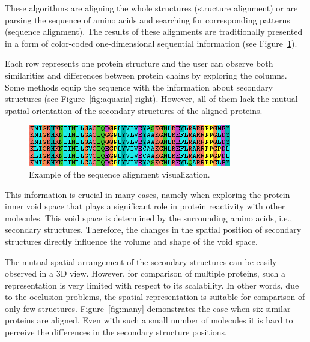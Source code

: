 \documentclass[twocolumn]{bmcart}%
\begin{document}
These algorithms are aligning the whole structures (structure alignment) or are parsing the sequence of amino acids and searching for corresponding patterns (sequence alignment). 
The results of these alignments are traditionally presented in a form of color-coded one-dimensional sequential information (see Figure~\ref{fig:align}).

Each row represents one protein structure and the user can observe both similarities and differences between protein chains by exploring the columns.
Some methods equip the sequence with the information about secondary structures (see Figure~\ref{fig:aquaria} right).
However, all of them lack the mutual spatial orientation of the secondary structures of the aligned proteins.

\begin{figure}[ht]
  \centering
  \includegraphics[width=0.9\columnwidth]{pics/align.png}
  \caption{Example of the sequence alignment visualization.}
  \label{fig:align}
\end{figure}

This information is crucial in many cases, namely when exploring the protein inner void space that plays a significant role in protein reactivity with other molecules.
This void space is determined by the surrounding amino acids, i.e., secondary structures. 
Therefore, the changes in the spatial position of secondary structures directly influence the volume and shape of the void space.



The mutual spatial arrangement of the secondary structures can be easily observed in a 3D view. 
However, for comparison of multiple proteins, such a representation is very limited with respect to its scalability.
In other words, due to the occlusion problems, the spatial representation is suitable for comparison of only few structures. 
Figure~\ref{fig:many} demonstrates the case when six similar proteins are aligned.
Even with such a small number of molecules it is hard to perceive the differences in the secondary structure positions.

\end{document}
